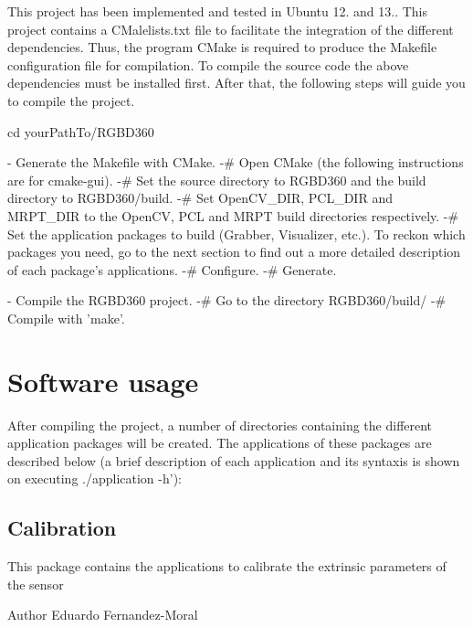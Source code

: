 This project has been implemented and tested in Ubuntu 12. and 13.. This project contains a C\-Malelists.\-txt file to facilitate the integration of the different dependencies. Thus, the program C\-Make is required to produce the Makefile configuration file for compilation. To compile the source code the above dependencies must be installed first. After that, the following steps will guide you to compile the project. \begin{DoxyVerb}cd yourPathTo/RGBD360
\end{DoxyVerb}
 \begin{DoxyVerb}  - Generate the Makefile with CMake.
       -# Open CMake (the following instructions are for cmake-gui).
       -# Set the source directory to RGBD360 and the build directory to RGBD360/build.
       -# Set OpenCV_DIR, PCL_DIR and MRPT_DIR to the OpenCV, PCL and MRPT build directories respectively.
       -# Set the application packages to build (Grabber, Visualizer, etc.). To reckon which packages you need, go to the next section to find out a more detailed description of each package's applications.
       -# Configure.
       -# Generate.

  - Compile the RGBD360 project.
       -# Go to the directory RGBD360/build/
       -# Compile with 'make'.
\end{DoxyVerb}
\hypertarget{index_usage_sec}{}\section{Software usage}\label{index_usage_sec}
After compiling the project, a number of directories containing the different application packages will be created. The applications of these packages are described below (a brief description of each application and its syntaxis is shown on executing ./application -\/h')\-: \hypertarget{index_Calibration}{}\subsection{Calibration}\label{index_Calibration}
This package contains the applications to calibrate the extrinsic parameters of the sensor

\begin{DoxyAuthor}{Author}
Eduardo Fernandez-\/\-Moral 
\end{DoxyAuthor}
